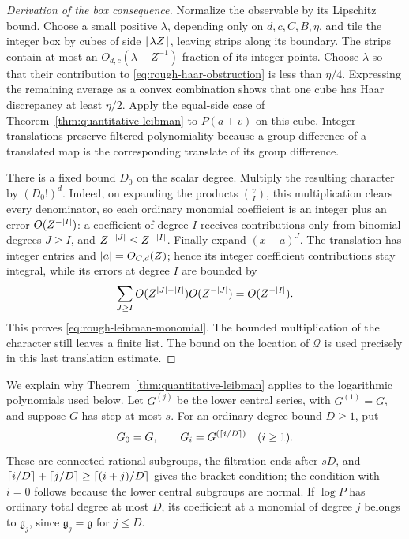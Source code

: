\begin{proof}[Derivation of the box consequence]
Normalize the observable by its Lipschitz bound.  Choose a small positive
$\lambda$, depending only on $d,c,C,B,\eta$, and tile the integer box by
cubes of side $\lfloor\lambda Z\rfloor$, leaving strips along its boundary.
The strips contain at most an $O_{d,c}(\lambda+Z^{-1})$ fraction of its
integer points.  Choose $\lambda$ so that their contribution to
\eqref{eq:rough-haar-obstruction} is less than $\eta/4$.  Expressing
the remaining average as a convex combination shows that one cube has
Haar discrepancy at least $\eta/2$. Apply the equal-side case of
Theorem~\ref{thm:quantitative-leibman} to
$P(a+v)$ on this cube.  Integer translations preserve filtered
polynomiality because a group difference of a translated map is the
corresponding translate of its group difference.

There is a fixed bound $D_0$ on the scalar degree.  Multiply the resulting
character by $(D_0!)^d$.  Indeed, on expanding the products
$\binom vI$, this multiplication clears every denominator, so each
ordinary monomial coefficient is an integer plus an error
$O(Z^{-\lvert I\rvert})$: a coefficient of degree $I$ receives contributions
only from binomial degrees $J\geq I$, and
$Z^{-\lvert J\rvert}\leq Z^{-\lvert I\rvert}$.  Finally expand $(x-a)^J$.
The translation has integer entries and $\lvert a\rvert=O_{C,d}(Z)$; hence
its integer coefficient contributions stay integral, while its errors
at degree $I$ are bounded by
\[
 \sum_{J\geq I}O(Z^{\lvert J\rvert-\lvert I\rvert})O(Z^{-\lvert J\rvert})
 =O(Z^{-\lvert I\rvert}).
\]
This proves \eqref{eq:rough-leibman-monomial}.  The bounded multiplication
of the character still leaves a finite list.  The bound on the location
of $\mathcal Q$ is used precisely in this last translation estimate.
\end{proof}

We explain why Theorem~\ref{thm:quantitative-leibman} applies to the logarithmic polynomials used
below.  Let $G^{(j)}$ be the lower central series, with $G^{(1)}=G$, and
suppose $G$ has step at most $s$.  For an ordinary degree bound $D\geq1$,
put
\begin{equation}
 G_0=G,\qquad G_i=G^{(\lceil i/D\rceil)}\quad(i\geq1).
 \label{eq:rough-stretched-filtration}
\end{equation}
These are connected rational subgroups, the filtration ends after $sD$,
and
$\lceil i/D\rceil+\lceil j/D\rceil\geq\lceil(i+j)/D\rceil$ gives the bracket
condition; the condition with $i=0$ follows because the lower central
subgroups are normal.  If $\log P$ has ordinary total degree at most
$D$, its coefficient at a monomial of degree $j$ belongs to
$\mathfrak g_j$, since $\mathfrak g_j=\mathfrak g$ for $j\leq D$.

